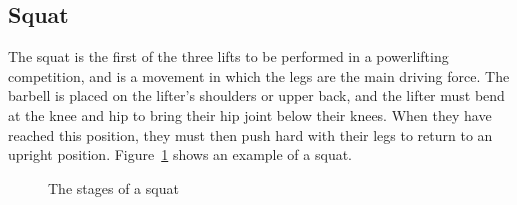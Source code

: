 \subsection{Squat}

The squat is the first of the three lifts to be performed in a powerlifting competition, and is a movement in which the legs are the main driving force. The barbell is placed on the lifter's shoulders or upper back, and the lifter must bend at the knee and hip to bring their hip joint below their knees. When they have reached this position, they must then push hard with their legs to return to an upright position. Figure~\ref{fig:squat_stages} shows an example of a squat.

\begin{figure}[H]
    \centering
\caption{The stages of a squat}
\label{fig:squat_stages}
\end{figure}

